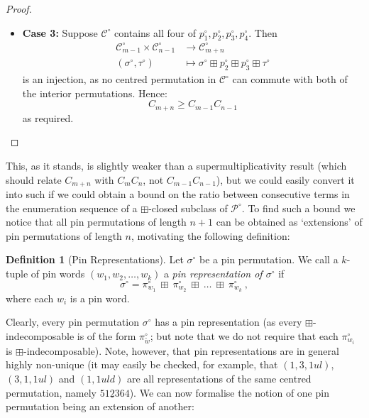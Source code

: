 \documentclass[11pt,a4paper]{article}
\theoremstyle{definition}
\newtheorem{defn}[thm]{Definition}
\begin{document}
\begin{proof}
\begin{itemize}
\[\]
as required.
\item \textbf{Case 3:} Suppose $\mathcal{C}^{\circ}$ contains all four of $p^{\circ}_{1}, p^{\circ}_{2}, p^{\circ}_{3}, p^{\circ}_{4}$. Then
\[
\begin{split}
\mathcal{C}^{\circ}_{m-1} \times \mathcal{C}^{\circ}_{n-1} & \rightarrow \mathcal{C}^{\circ}_{m+n} \\
\left(\sigma^{\circ}, \tau^{\circ}\right) & \mapsto \sigma^{\circ} \boxplus p^{\circ}_{2} \boxplus p^{\circ}_{3} \boxplus \tau^{\circ}
\end{split}
\]
is an injection, as no centred permutation in $\mathcal{C}^{\circ}$ can commute with both of the interior permutations. Hence:
\[
C_{m+n} \geq C_{m-1}C_{n-1}
\]
as required.
\end{itemize}
\end{proof}

This, as it stands, is slightly weaker than a supermultiplicativity result (which should relate $C_{m+n}$ with $C_{m}C_{n}$, not $C_{m-1}C_{n-1}$), but we could easily convert it into such if we could obtain a bound on the ratio between consecutive terms in the enumeration sequence of a $\boxplus$-closed subclass of $\mathcal{P}^{\circ}$. To find such a bound we notice that all pin permutations of length $n+1$ can be obtained as `extensions' of pin permutations of length $n$, motivating the following definition:

\begin{defn}[Pin Representations]
Let $\sigma^{\circ}$ be a pin permutation. We call a $k$-tuple of pin words $\left(w_{1}, w_{2}, \dots, w_{k}\right)$ a \emph{pin representation of $\sigma^{\circ}$} if
\[
\sigma^{\circ} = \pi^{\circ}_{w_{1}} \ \boxplus \ \pi^{\circ}_{w_{2}} \ \boxplus \ \dots \ \boxplus \ \pi^{\circ}_{w_{k}} \ ,
\]
where each $w_{i}$ is a pin word.
\end{defn}

Clearly, every pin permutation $\sigma^{\circ}$ has a pin representation (as every $\boxplus$-indecomposable is of the form $\pi^{\circ}_{\widetilde{w}}$; but note that we do not require that each $\pi^{\circ}_{w_{i}}$ is $\boxplus$-indecomposable). Note, however, that pin representations are in general highly non-unique (it may easily be checked, for example, that $\left(1, 3, 1ul\right)$, $\left(3, 1, 1ul\right)$ and $\left(1, 1uld\right)$ are all representations of the same centred permutation, namely $51\underline{2}364$). We can now formalise the notion of one pin permutation being an extension of another:
\end{document}
